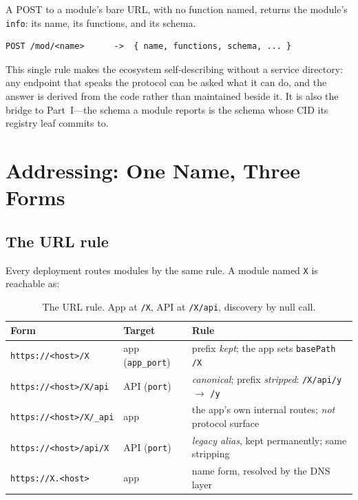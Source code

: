 \documentclass[11pt,a4paper]{article}
\begin{document}
A POST to a module's bare URL, with no function named, returns the module's
\texttt{info}: its name, its functions, and its schema.

\begin{lstlisting}[style=python]
POST /mod/<name>      ->  { name, functions, schema, ... }
\end{lstlisting}

This single rule makes the ecosystem self-describing without a service
directory: any endpoint that speaks the protocol can be asked what it can do,
and the answer is derived from the code rather than maintained beside it. It is
also the bridge to Part~I---the schema a module reports is the schema whose CID
its registry leaf commits to.

\section{Addressing: One Name, Three Forms}

\subsection{The URL rule}

Every deployment routes modules by the same rule. A module named \texttt{X} is
reachable as:

\begin{table}[H]
\centering
\begin{tabularx}{\textwidth}{llX}
\toprule
\textbf{Form} & \textbf{Target} & \textbf{Rule} \\
\midrule
\texttt{https://<host>/X} & app (\texttt{app\_port}) & prefix \emph{kept}; the app sets \texttt{basePath /X} \\
\texttt{https://<host>/X/api} & API (\texttt{port}) & \emph{canonical}; prefix \emph{stripped}: \texttt{/X/api/y} $\to$ \texttt{/y} \\
\texttt{https://<host>/X/\_api} & app & the app's own internal routes; \emph{not} protocol surface \\
\texttt{https://<host>/api/X} & API (\texttt{port}) & \emph{legacy alias}, kept permanently; same stripping \\
\texttt{https://X.<host>} & app & name form, resolved by the DNS layer \\
\bottomrule
\end{tabularx}
\caption{The URL rule. App at \texttt{/X}, API at \texttt{/X/api}, discovery by null call.}
\end{table}
\end{document}
